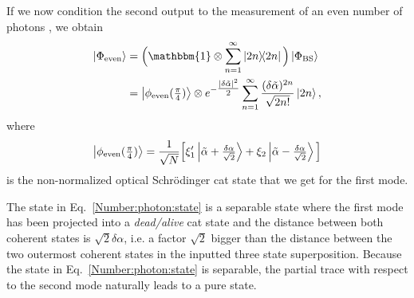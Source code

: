If we now condition the second output to the measurement of an even number of photons \cite{Lvovsky2020,Gerrits2010}, we obtain
\begin{equation}\label{Number:photon:state}
    \begin{aligned}
    \ket{\Phi_\text{even}}
        &= \Big( 
                \mathbbm{1} \otimes \sum_{n=1}^\infty \dyad{2n}
            \Big)
            \ket{\Phi_\text{BS}}
        \\
        &= \ket{\phi_\text{even}(\tfrac{\pi}{4})}
            \otimes
            e^{-\tfrac{|\delta \Tilde{\alpha}|^2}{2}}
            \sum^{\infty}_{n=1} \dfrac{(\delta \Tilde{\alpha})^{2n}}{\sqrt{2n!}}
            \ket{2n},
    \end{aligned}
\end{equation}
where
\begin{equation}
    \ket{\phi_\text{even}(\tfrac{\pi}{4})} =
    \dfrac{1}{\sqrt{N}}
            \Big[
                 \xi_1'\ket{\Tilde{\alpha} + \tfrac{\delta\alpha}{\sqrt{2}}}
                 + \xi_2 \ket{\Tilde{\alpha} - \tfrac{\delta\alpha}{\sqrt{2}}}
            \Big]
\end{equation}
is the non-normalized optical Schrödinger cat state that we get for the first mode. 

The state in Eq.~\eqref{Number:photon:state} is a separable state where the first mode has been projected into a \emph{dead/alive} cat state and the distance between both coherent states is $\sqrt{2}\delta \alpha$, i.e. a factor $\sqrt{2}$ bigger than the distance between the two outermost coherent states in the inputted three state superposition. Because the state in Eq.~\eqref{Number:photon:state} is separable, the partial trace with respect to the second mode naturally leads to a pure state.

